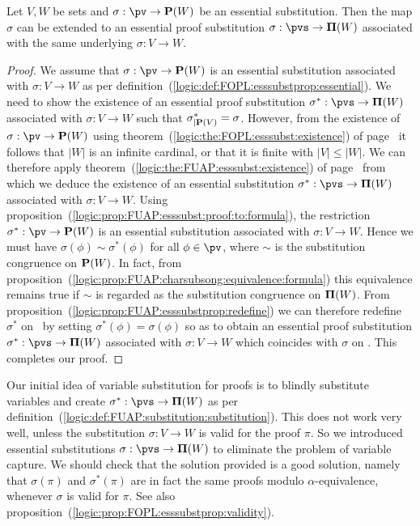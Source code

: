 \begin{prop}\label{logic:prop:FUAP:esssubstprop:extension}
Let $V,W$ be sets and $\sigma:\pv\to{\bf P}(W)$ be an essential
substitution. Then the map $\sigma$ can be extended to an essential
proof substitution $\sigma:\pvs\to{\bf\Pi}(W)$ associated with the
same underlying $\sigma:V\to W$.
\end{prop}
\begin{proof}
We assume that $\sigma:\pv\to{\bf P}(W)$ is an essential
substitution associated with $\sigma:V\to W$ as per
definition~(\ref{logic:def:FOPL:esssubstprop:essential}). We need to
show the existence of an essential proof substitution
$\sigma^{*}:\pvs\to{\bf\Pi}(W)$ associated with $\sigma:V\to W$ such
that $\sigma^{*}_{|{\bf P}(V)}=\sigma$. However, from the existence
of $\sigma:\pv\to{\bf P}(W)$ using
theorem~(\ref{logic:the:FOPL:esssubst:existence}) of
page~\pageref{logic:the:FOPL:esssubst:existence} it follows that
$|W|$ is an infinite cardinal, or that it is finite with
$|V|\leq|W|$. We can therefore apply
theorem~(\ref{logic:the:FUAP:esssubst:existence}) of
page~\pageref{logic:the:FUAP:esssubst:existence} from which we
deduce the existence of an essential substitution
$\sigma^{*}:\pvs\to{\bf\Pi}(W)$ associated with $\sigma:V\to W$.
Using proposition~(\ref{logic:prop:FUAP:esssubst:proof:to:formula}),
the restriction $\sigma^{*}:\pv\to{\bf P}(W)$ is an essential
substitution associated with $\sigma:V\to W$. Hence we must have
$\sigma(\phi)\sim\sigma^{*}(\phi)$ for all $\phi\in\pv$, where
$\sim$ is the substitution congruence on ${\bf P}(W)$. In fact, from
proposition~(\ref{logic:prop:FUAP:charsubsong:equivalence:formula})
this equivalence remains true if $\sim$ is regarded as the
substitution congruence on ${\bf\Pi}(W)$. From
proposition~(\ref{logic:prop:FUAP:esssubstprop:redefine}) we can
therefore redefine $\sigma^{*}$ on \pv\ by setting
$\sigma^{*}(\phi)=\sigma(\phi)$ so as to obtain an essential proof
substitution $\sigma^{*}:\pvs\to{\bf\Pi}(W)$ associated with
$\sigma:V\to W$ which coincides with $\sigma$ on \pv. This completes
our proof.
\end{proof}

Our initial idea of variable substitution for proofs is to blindly
substitute variables and create $\sigma^{*}:\pvs\to{\bf\Pi}(W)$ as
per definition~(\ref{logic:def:FUAP:substitution:substitution}).
This does not work very well, unless the substitution $\sigma:V\to
W$ is valid for the proof $\pi$. So we introduced essential
substitutions $\sigma:\pvs\to{\bf\Pi}(W)$ to eliminate the problem
of variable capture. We should check that the solution provided is a
good solution, namely that $\sigma(\pi)$ and $\sigma^{*}(\pi)$ are
in fact the same proofs modulo $\alpha$-equivalence, whenever
$\sigma$ is valid for $\pi$. See also
proposition~(\ref{logic:prop:FOPL:esssubstprop:validity}).

